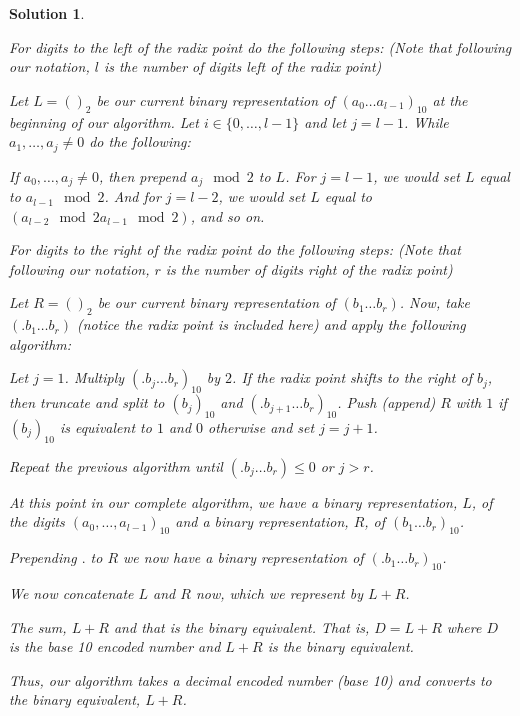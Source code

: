 \documentclass[12pt, letterpaper]{article}
\theoremstyle{nonumberplain}
\newtheorem{sol}{Solution}
\begin{document}
\begin{sol}
\begin{enumerate}[label=\alph*)]
		      For digits to the left of the radix point do the following steps: (Note that following our notation, $l$ is the number of digits left of the radix point)

		      Let $L = ()_2$ be our current binary representation of $(a_0\ldots a_{l-1})_{10}$ at the beginning of our algorithm. Let $i\in \{0, \ldots, l-1\}$ and let $j = l-1$. While $a_1,\ldots, a_j \neq 0$ do the following:

		      If $a_0, \ldots, a_{j}\neq 0$, then prepend $a_j\mod 2$ to $L$. For $j = l-1$, we would set $L$ equal to $a_{l-1}\mod 2$. And for $j = l-2$, we would set $L$ equal to $(a_{l-2}\mod 2 a_{l-1}\mod 2)$, and so on.

		      For digits to the right of the radix point do the following steps: (Note that following our notation, $r$ is the number of digits right of the radix point)

		      Let $R = ()_2$ be our current binary representation of $(b_1 \ldots b_r)$. Now, take $(.b_1 \ldots b_r)$ (notice the radix point is included here) and apply the following algorithm:

		      Let $j = 1$. Multiply $(.b_j \ldots b_r)_{10}$ by $2$. If the radix point shifts to the right of $b_j$, then truncate and split to $(b_{j})_{10}$ and $(.b_{j+1}\ldots b_r)_{10}$. Push (append) $R$ with $1$ if $(b_j)_{10}$ is equivalent to $1$ and $0$ otherwise and set $j = j+1$.

		      Repeat the previous algorithm until $(.b_j\ldots b_r)\leq 0$ or $j > r$.

		      At this point in our complete algorithm, we have a binary representation, $L$, of the digits $(a_0, \ldots, a_{l-1})_{10}$ and a binary representation, $R$, of $(b_1 \ldots b_r)_{10}$.

		      Prepending $.$ to $R$ we now have a binary representation of $(.b_1\ldots b_r)_{10}$.

		      We now concatenate $L$ and $R$ now, which we represent by $L+R$.

		      The sum, $L+R$ and that is the binary equivalent. That is, $D = L+R$ where $D$ is the base 10 encoded number and $L+R$ is the binary equivalent.

		      Thus, our algorithm takes a decimal encoded number (base 10) and converts to the binary equivalent, $L+R$.



	\end{enumerate}
\end{sol}
\end{document}
